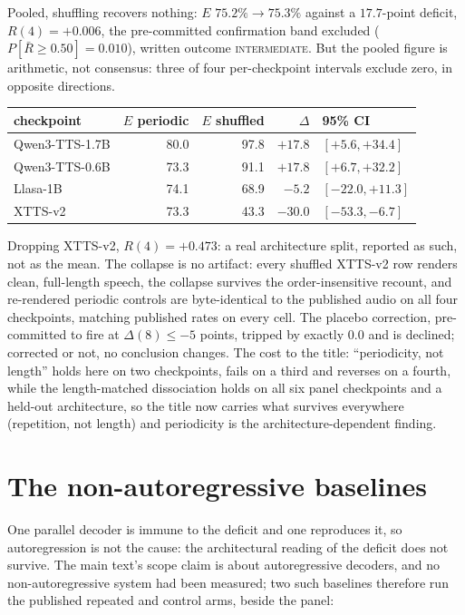 Pooled, shuffling recovers nothing: $E$ $75.2\% \to 75.3\%$ against a
$17.7$-point deficit, $R(4)=+0.006$, the pre-committed confirmation
band excluded ($P[\bar R \ge 0.50]=0.010$), written outcome
\textsc{intermediate}. But the pooled figure is arithmetic, not
consensus: three of four per-checkpoint intervals exclude zero, in
opposite directions.

\begin{center}
\begin{tabular}{@{}lrrrl@{}}
\toprule
checkpoint & $E$ periodic & $E$ shuffled & $\Delta$ & 95\% CI \\
\midrule
Qwen3-TTS-1.7B & 80.0 & 97.8 & $+17.8$ & $[+5.6, +34.4]$ \\
Qwen3-TTS-0.6B & 73.3 & 91.1 & $+17.8$ & $[+6.7, +32.2]$ \\
Llasa-1B       & 74.1 & 68.9 & $-5.2$  & $[-22.0, +11.3]$ \\
XTTS-v2        & 73.3 & 43.3 & $-30.0$ & $[-53.3, -6.7]$ \\
\bottomrule
\end{tabular}
\end{center}

\noindent Dropping XTTS-v2, $R(4)=+0.473$: a real architecture split,
reported as such, not as the mean. The collapse is no artifact: every
shuffled XTTS-v2 row renders clean, full-length speech, the collapse
survives the order-insensitive recount, and re-rendered periodic
controls are byte-identical to the published audio on all four
checkpoints, matching published rates on every cell. The placebo
correction, pre-committed to fire at $\Delta(8)\le-5$ points, tripped
by exactly $0.0$ and is declined; corrected or not, no conclusion
changes. The cost to the title: ``periodicity, not length'' holds here
on two checkpoints, fails on a third and reverses on a fourth, while
the length-matched dissociation holds on all six panel checkpoints and
a held-out architecture, so the title now carries what survives
everywhere (repetition, not length) and periodicity is the
architecture-dependent finding.

\section{The non-autoregressive baselines}
\label{sec:nonar}

One parallel decoder is immune to the deficit and one reproduces it,
so autoregression is not the cause: the architectural reading of the
deficit does not survive. The main text's scope claim is about
autoregressive decoders, and no non-autoregressive system had been
measured; two such baselines therefore run the published repeated and
control arms, beside the panel:


